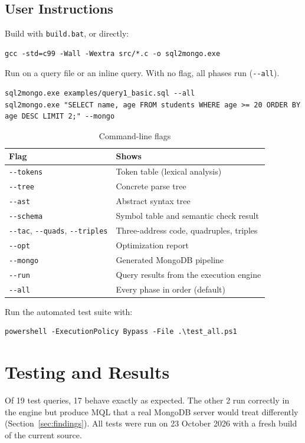 \documentclass[12pt,a4paper]{report}
\newcommand{\codeus}{\textunderscore\allowbreak}
\DeclareRobustCommand{\code}[1]{\texttt{\let\_\codeus #1}}
\begin{document}
\section{User Instructions}
Build with \code{build.bat}, or directly:
\begin{lstlisting}
gcc -std=c99 -Wall -Wextra src/*.c -o sql2mongo.exe
\end{lstlisting}
Run on a query file or an inline query. With no flag, all phases run (\code{-{}-all}).
\begin{lstlisting}
sql2mongo.exe examples/query1_basic.sql --all
sql2mongo.exe "SELECT name, age FROM students WHERE age >= 20 ORDER BY age DESC LIMIT 2;" --mongo
\end{lstlisting}
\begin{table}[H]
\centering\small
\begin{tabular}{|l|l|}
\hline
\textbf{Flag} & \textbf{Shows} \\ \hline
\code{-{}-tokens} & Token table (lexical analysis) \\ \hline
\code{-{}-tree} & Concrete parse tree \\ \hline
\code{-{}-ast} & Abstract syntax tree \\ \hline
\code{-{}-schema} & Symbol table and semantic check result \\ \hline
\code{-{}-tac}, \code{-{}-quads}, \code{-{}-triples} & Three-address code, quadruples, triples \\ \hline
\code{-{}-opt} & Optimization report \\ \hline
\code{-{}-mongo} & Generated MongoDB pipeline \\ \hline
\code{-{}-run} & Query results from the execution engine \\ \hline
\code{-{}-all} & Every phase in order (default) \\ \hline
\end{tabular}
\caption{Command-line flags}
\end{table}
Run the automated test suite with:
\begin{lstlisting}
powershell -ExecutionPolicy Bypass -File .\test_all.ps1
\end{lstlisting}

\chapter{Testing and Results}
Of 19 test queries, 17 behave exactly as expected. The other 2 run correctly in the engine but produce MQL that a real MongoDB server would treat differently (Section~\ref{sec:findings}). All tests were run on 23 October 2026 with a fresh build of the current source.
\end{document}

